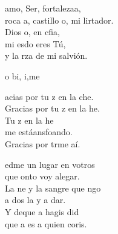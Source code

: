 \documentclass[12pt]{article}
\begin{document}
\begin{multicols*}{2}
\begin{cancion}%
	 amo, Ser, fortalezaa, \\
	roca a, castillo o, mi lirtador. \\
	Dios o, en cfia, \\
	mi esdo eres Tú,\\
	y la rza de mi salvión.\\
\end{cancion}%

\begin{cancion}%
	o bi, i,me\\
\end{cancion}%

\begin{cancion}%
	acias por tu z en la che.\\
	Gracias por tu z en la he.\\
	Tu z en la he \\
	me estáansfoando.\\
	Gracias por trme aí.\\
\end{cancion}%

\begin{cancion}%
	edme un lugar en votros\\
	que onto voy alegar.\\
	La ne y la sangre que ngo \\
	a dos la y a dar.\\
	Y deque a hagis did \\
	que a  es a quien coris. \\
\end{cancion}%


\end{multicols*}
\end{document}
